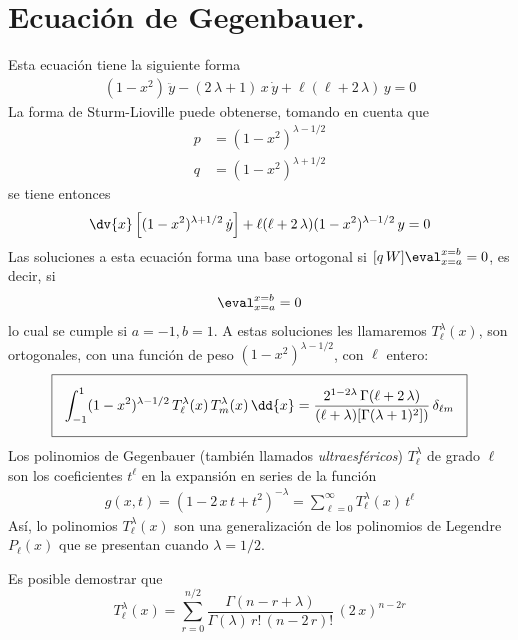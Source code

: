 \section{Ecuación de Gegenbauer.}
Esta ecuación tiene la siguiente forma
\begin{align*}
(1 - x^{2}) \, \ddot{y} - (2 \, \lambda + 1) \, x \,\dot{y} + \ell (\ell + 2 \, \lambda) \, y = 0
\end{align*}
La forma de Sturm-Lioville puede obtenerse, tomando en cuenta que
\begin{align*}
p &= (1 -x^{2})^{\lambda - 1/2} \\
q &= (1- x^{2})^{\lambda + 1/2}
\end{align*}
se tiene entonces
\begin{align*}
\dv{x} \left[ (1 - x^{2})^{\lambda+1/2} \, \dot{y} \right] + \ell (\ell + 2 \, \lambda) (1 - x^{2})^{\lambda-1/2} \, y = 0
\end{align*}
Las soluciones a esta ecuación forma una base ortogonal si $[ q \, W]\eval_{x=a}^{x=b} = 0$, es decir, si
\begin{align*}
[(1 - x^{2})^{\lambda+1/2} \, W]\eval_{x=a}^{x=b} = 0
\end{align*}
lo cual se cumple si $a = -1, b = 1$. A estas soluciones les llamaremos $T_{\ell}^{\lambda} (x)$, son ortogonales, con una función de peso $(1 - x^{2})^{\lambda-1/2}$, con $\ell$ entero:
\begin{align*}
\setlength{\fboxsep}{3\fboxsep}\boxed{\int_{-1}^{1} (1 - x^{2})^{\lambda-1/2} \, T_{\ell}^{\lambda} (x) \, T_{m}^{\lambda} (x) \, \dd{x}
 = \dfrac{2^{1-2 \lambda} \, \Gamma (\ell + 2 \, \lambda)}{(\ell + \lambda) [ \Gamma (\lambda + 1)^{2}])} \, \delta_{\ell m}}
\end{align*}
Los polinomios de Gegenbauer (también llamados \emph{ultraesféricos}) $T_{\ell}^{\lambda}$ de grado $\ell$ son los coeficientes $t^{\ell}$ en la expansión en series de la función
\begin{align*}
g(x, t) = (1 - 2 \, x \, t + t^{2})^{-\lambda} = \sum_{\ell=0}^{\infty} T_{\ell}^{\lambda} (x) \, t^{\ell}
\end{align*}
Así, lo polinomios $T_{\ell}^{\lambda} (x)$ son una generalización de los polinomios de Legendre $P_{\ell}(x)$ que se presentan cuando $\lambda = 1/2$.
\par
Es posible demostrar que
\begin{equation}
T_{\ell}^{\lambda} (x) = \sum_{r=0}^{n/2} \dfrac{\Gamma (n - r + \lambda)}{\Gamma (\lambda) \, r! \, (n - 2 \, r)!} \, (2 \, x)^{n-2r}
\label{eq:ecuacion_08_86}
\end{equation}
